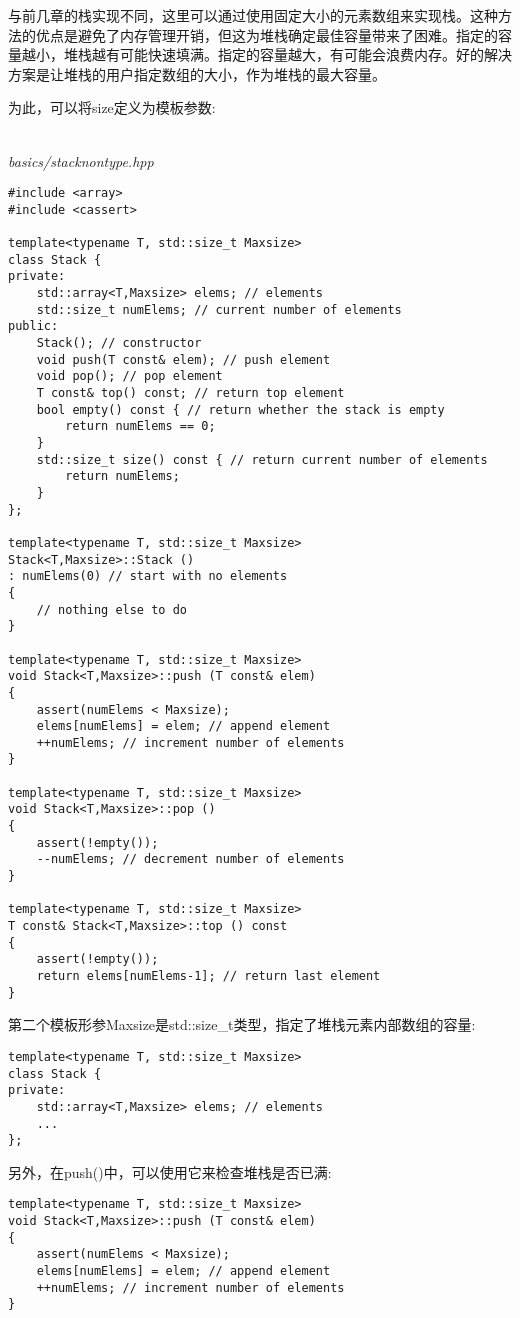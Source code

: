 与前几章的栈实现不同，这里可以通过使用固定大小的元素数组来实现栈。这种方法的优点是避免了内存管理开销，但这为堆栈确定最佳容量带来了困难。指定的容量越小，堆栈越有可能快速填满。指定的容量越大，有可能会浪费内存。好的解决方案是让堆栈的用户指定数组的大小，作为堆栈的最大容量。

为此，可以将size定义为模板参数:

\hspace*{\fill} \\ %
\noindent
\textit{basics/stacknontype.hpp}
\begin{lstlisting}[style=styleCXX]
#include <array>
#include <cassert>

template<typename T, std::size_t Maxsize>
class Stack {
private:
	std::array<T,Maxsize> elems; // elements
	std::size_t numElems; // current number of elements
public:
	Stack(); // constructor
	void push(T const& elem); // push element
	void pop(); // pop element
	T const& top() const; // return top element
	bool empty() const { // return whether the stack is empty
		return numElems == 0;
	}
	std::size_t size() const { // return current number of elements
		return numElems;
	}
};

template<typename T, std::size_t Maxsize>
Stack<T,Maxsize>::Stack ()
: numElems(0) // start with no elements
{
	// nothing else to do
}

template<typename T, std::size_t Maxsize>
void Stack<T,Maxsize>::push (T const& elem)
{
	assert(numElems < Maxsize);
	elems[numElems] = elem; // append element
	++numElems; // increment number of elements
}

template<typename T, std::size_t Maxsize>
void Stack<T,Maxsize>::pop ()
{
	assert(!empty());
	--numElems; // decrement number of elements
}

template<typename T, std::size_t Maxsize>
T const& Stack<T,Maxsize>::top () const
{
	assert(!empty());
	return elems[numElems-1]; // return last element
}
\end{lstlisting}

第二个模板形参Maxsize是std::size\_t类型，指定了堆栈元素内部数组的容量:

\begin{lstlisting}[style=styleCXX]
template<typename T, std::size_t Maxsize>
class Stack {
private:
	std::array<T,Maxsize> elems; // elements
	...
};
\end{lstlisting}

另外，在push()中，可以使用它来检查堆栈是否已满:

\begin{lstlisting}[style=styleCXX]
template<typename T, std::size_t Maxsize>
void Stack<T,Maxsize>::push (T const& elem)
{
	assert(numElems < Maxsize);
	elems[numElems] = elem; // append element
	++numElems; // increment number of elements
}
\end{lstlisting}

